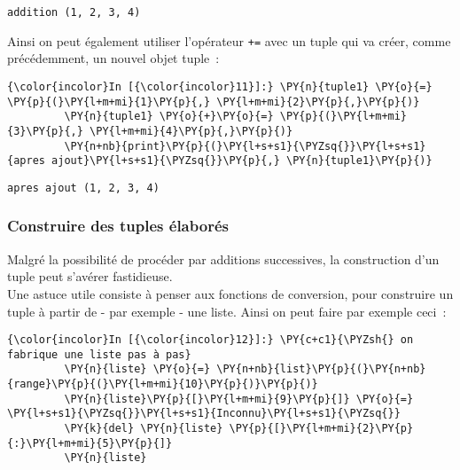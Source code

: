     \begin{Verbatim}[commandchars=\\\{\}]
addition (1, 2, 3, 4)

    \end{Verbatim}

    Ainsi on peut également utiliser l'opérateur \texttt{+=} avec un tuple
qui va créer, comme précédemment, un nouvel objet tuple~:

    \begin{Verbatim}[commandchars=\\\{\}]
{\color{incolor}In [{\color{incolor}11}]:} \PY{n}{tuple1} \PY{o}{=} \PY{p}{(}\PY{l+m+mi}{1}\PY{p}{,} \PY{l+m+mi}{2}\PY{p}{,}\PY{p}{)}
         \PY{n}{tuple1} \PY{o}{+}\PY{o}{=} \PY{p}{(}\PY{l+m+mi}{3}\PY{p}{,} \PY{l+m+mi}{4}\PY{p}{,}\PY{p}{)}
         \PY{n+nb}{print}\PY{p}{(}\PY{l+s+s1}{\PYZsq{}}\PY{l+s+s1}{apres ajout}\PY{l+s+s1}{\PYZsq{}}\PY{p}{,} \PY{n}{tuple1}\PY{p}{)}
\end{Verbatim}


    \begin{Verbatim}[commandchars=\\\{\}]
apres ajout (1, 2, 3, 4)

    \end{Verbatim}

    \hypertarget{construire-des-tuples-uxe9laboruxe9s}{%
\subsubsection{Construire des tuples
élaborés}\label{construire-des-tuples-uxe9laboruxe9s}}

    Malgré la possibilité de procéder par additions successives, la
construction d'un tuple peut s'avérer fastidieuse.\\

    Une astuce utile consiste à penser aux fonctions de conversion, pour
construire un tuple à partir de - par exemple - une liste. Ainsi on peut
faire par exemple ceci~:

    \begin{Verbatim}[commandchars=\\\{\}]
{\color{incolor}In [{\color{incolor}12}]:} \PY{c+c1}{\PYZsh{} on fabrique une liste pas à pas}
         \PY{n}{liste} \PY{o}{=} \PY{n+nb}{list}\PY{p}{(}\PY{n+nb}{range}\PY{p}{(}\PY{l+m+mi}{10}\PY{p}{)}\PY{p}{)}
         \PY{n}{liste}\PY{p}{[}\PY{l+m+mi}{9}\PY{p}{]} \PY{o}{=} \PY{l+s+s1}{\PYZsq{}}\PY{l+s+s1}{Inconnu}\PY{l+s+s1}{\PYZsq{}}
         \PY{k}{del} \PY{n}{liste} \PY{p}{[}\PY{l+m+mi}{2}\PY{p}{:}\PY{l+m+mi}{5}\PY{p}{]}
         \PY{n}{liste}
\end{Verbatim}



